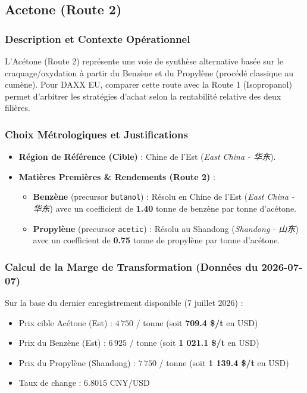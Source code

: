 \documentclass[12pt,a4paper]{article}
\begin{document}
\subsection{Acetone (Route 2)}

\subsubsection{Description et Contexte Opérationnel}
L'Acétone (Route 2) représente une voie de synthèse alternative basée sur le craquage/oxydation à partir du Benzène et du Propylène (procédé classique au cumène). Pour DAXX EU, comparer cette route avec la Route 1 (Isopropanol) permet d'arbitrer les stratégies d'achat selon la rentabilité relative des deux filières.

\subsubsection{Choix Métrologiques et Justifications}
\begin{itemize}
    \item \textbf{Région de Référence (Cible)} : Chine de l'Est (\textit{East China - 华东}).
    \item \textbf{Matières Premières \& Rendements (Route 2)} :
    \begin{itemize}
        \item \textbf{Benzène} (precursor \texttt{butanol}) : Résolu en Chine de l'Est (\textit{East China - 华东}) avec un coefficient de \textbf{1.40} tonne de benzène par tonne d'acétone.
        \item \textbf{Propylène} (precursor \texttt{acetic}) : Résolu au Shandong (\textit{Shandong - 山东}) avec un coefficient de \textbf{0.75} tonne de propylène par tonne d'acétone.
    \end{itemize}
\end{itemize}

\subsubsection{Calcul de la Marge de Transformation (Données du 2026-07-07)}
Sur la base du dernier enregistrement disponible (7 juillet 2026) :
\begin{itemize}
    \item Prix cible Acétone (Est) : $4\,750$ \yen / tonne (soit \textbf{709.4 \$/t} en USD)
    \item Prix du Benzène (Est) : $6\,925$ \yen / tonne (soit \textbf{1 021.1 \$/t} en USD)
    \item Prix du Propylène (Shandong) : $7\,750$ \yen / tonne (soit \textbf{1 139.4 \$/t} en USD)
    \item Taux de change : $6.8015$ CNY/USD
\end{itemize}
\end{document}
